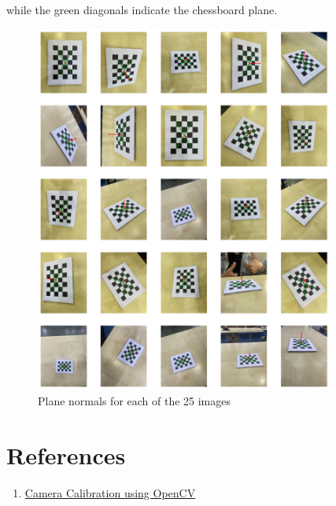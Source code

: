 \documentclass[10pt]{article}
\begin{document}
\begin{enumerate}
        while the green diagonals indicate the chessboard plane.
        \begin{figure}[htbp]
            \begin{center}
                \includegraphics[width=0.875\textwidth]{Assets/Question-4/normals.png}
                \caption{Plane normals for each of the 25 images}
                \label{fig:normals}
            \end{center}
        \end{figure}
    \end{enumerate}

    \section*{References}
    \begin{enumerate}
        \item \href{https://learnopencv.com/camera-calibration-using-opencv/}{
            Camera Calibration using OpenCV
        }
    \end{enumerate}
\end{document}
